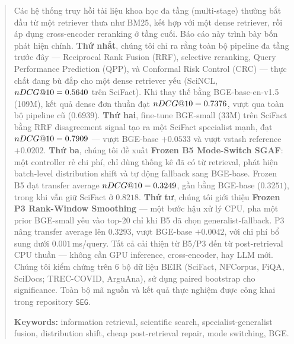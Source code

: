 \begin{abstract}
\noindent
Các hệ thống truy hồi tài liệu khoa học đa tầng (multi-stage) thường bắt đầu từ một retriever thưa
như BM25, kết hợp với một dense retriever, rồi áp dụng cross-encoder reranking ở tầng cuối. Báo cáo
này trình bày bốn phát hiện chính. \textbf{Thứ nhất}, chúng tôi chỉ ra rằng toàn bộ pipeline đa tầng
trước đây --- Reciprocal Rank Fusion (RRF), selective reranking, Query Performance Prediction (QPP), và
Conformal Risk Control (CRC) --- thực chất đang bù đắp cho một dense retriever yếu (SciNCL, $\ndcg =
0.5640$ trên SciFact). Khi thay thế bằng BGE-base-en-v1.5 (109M), kết quả dense đơn thuần đạt $\ndcg
= 0.7376$, vượt qua toàn bộ pipeline cũ ($0.6939$). \textbf{Thứ hai}, fine-tune BGE-small (33M) trên
SciFact bằng RRF disagreement signal tạo ra một SciFact specialist mạnh, đạt $\ndcg = 0.7909$ --- vượt
BGE-base $+0.0533$ và vượt vstash reference $+0.0202$. \textbf{Thứ ba}, chúng tôi đề xuất
\textbf{Frozen B5 Mode-Switch SGAF}: một controller rẻ chi phí, chỉ dùng thống kê đã có từ retrieval,
phát hiện batch-level distribution shift và tự động fallback sang BGE-base. Frozen B5 đạt transfer
average $\ndcg = 0.3249$, gần bằng BGE-base ($0.3251$), trong khi vẫn giữ SciFact ở $0.8218$.
\textbf{Thứ tư}, chúng tôi giới thiệu \textbf{Frozen P3 Rank-Window Smoothing} --- một bước hậu xử lý
CPU, pha một prior BGE-small yếu vào top-20 chỉ khi B5 đã chọn generalist-fallback. P3 nâng transfer
average lên $0.3293$, vượt BGE-base $+0.0042$, với chi phí bổ sung dưới $0.001$\,ms/query. Tất cả cải
thiện từ B5/P3 đến từ post-retrieval CPU thuần --- không cần GPU inference, cross-encoder, hay LLM mới.
Chúng tôi kiểm chứng trên 6 bộ dữ liệu BEIR (SciFact, NFCorpus, FiQA, SciDocs; TREC-COVID, ArguAna),
sử dụng paired bootstrap cho significance. Toàn bộ mã nguồn và kết quả thực nghiệm được công khai
trong repository \texttt{SEG}.

\medskip
\noindent\textbf{Keywords:} information retrieval, scientific search, specialist-generalist fusion,
distribution shift, cheap post-retrieval repair, mode switching, BGE.
\end{abstract}
